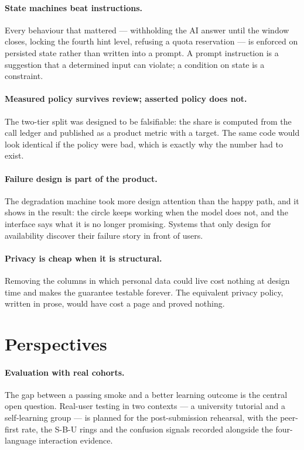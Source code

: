 \paragraph{State machines beat instructions.} Every behaviour that mattered --- withholding
the AI answer until the window closes, locking the fourth hint level, refusing a quota
reservation --- is enforced on persisted state rather than written into a prompt. A prompt
instruction is a suggestion that a determined input can violate; a condition on state is a
constraint.

\paragraph{Measured policy survives review; asserted policy does not.} The two-tier split
was designed to be falsifiable: the share is computed from the call ledger and published as
a product metric with a target. The same code would look identical if the policy were bad,
which is exactly why the number had to exist.

\paragraph{Failure design is part of the product.} The degradation machine took more design
attention than the happy path, and it shows in the result: the circle keeps working when the
model does not, and the interface says what it is no longer promising. Systems that only
design for availability discover their failure story in front of users.

\paragraph{Privacy is cheap when it is structural.} Removing the columns in which personal
data could live cost nothing at design time and makes the guarantee testable forever. The
equivalent privacy policy, written in prose, would have cost a page and proved nothing.

\section{Perspectives}

\paragraph{Evaluation with real cohorts.} The gap between a passing smoke and a better
learning outcome is the central open question. Real-user testing in two contexts --- a
university tutorial and a self-learning group --- is planned for the post-submission rehearsal,
with the peer-first rate, the S-B-U rings and the confusion signals recorded alongside the
four-language interaction evidence.

